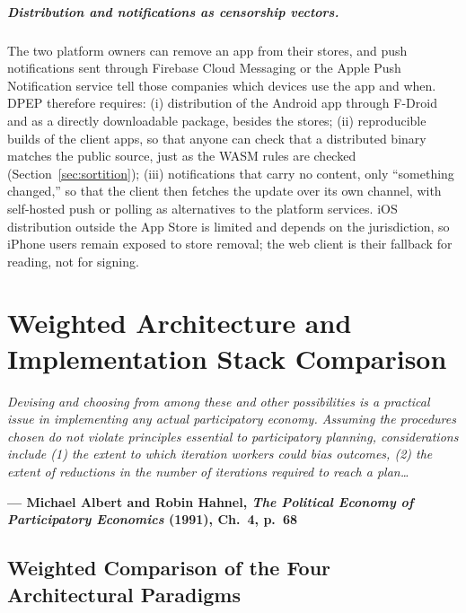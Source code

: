 \documentclass[10pt,twoside,openany]{book}
\theoremstyle{dpepstyle}
\newcommand{\chapterepigraph}[2]{%
  \vspace{-0.4em}
  \begin{FlushRight}
  \begin{minipage}{0.82\textwidth}
    \itshape\small\color{SlateDark} #1\par
    \vspace{3pt}
    \upshape\footnotesize\textbf{--- #2}
  \end{minipage}
  \end{FlushRight}
  \vspace{1em}
}
\newenvironment{FlushRight}{\begin{flushright}}{\end{flushright}}
\begin{document}
\paragraph{Distribution and notifications as censorship vectors.} The two platform owners can remove an app from their stores, and push notifications sent through Firebase Cloud Messaging or the Apple Push Notification service tell those companies which devices use the app and when. DPEP therefore requires: (i) distribution of the Android app through F-Droid and as a directly downloadable package, besides the stores; (ii) reproducible builds of the client apps, so that anyone can check that a distributed binary matches the public source, just as the WASM rules are checked (Section~\ref{sec:sortition}); (iii) notifications that carry no content, only ``something changed,'' so that the client then fetches the update over its own channel, with self-hosted push or polling as alternatives to the platform services. iOS distribution outside the App Store is limited and depends on the jurisdiction, so iPhone users remain exposed to store removal; the web client is their fallback for reading, not for signing.

\chapter{Weighted Architecture and Implementation Stack Comparison}
\label{ch:comparison}

\chapterepigraph{Devising and choosing from among these and other possibilities is a practical issue in implementing any actual participatory economy. Assuming the procedures chosen do not violate principles essential to participatory planning, considerations include (1) the extent to which iteration workers could bias outcomes, (2) the extent of reductions in the number of iterations required to reach a plan\dots}{Michael Albert and Robin Hahnel, \emph{The Political Economy of Participatory Economics} (1991), Ch.~4, p.~68\protect\footnotemark}

\section{Weighted Comparison of the Four Architectural Paradigms}
\label{sec:weighted}
\end{document}
